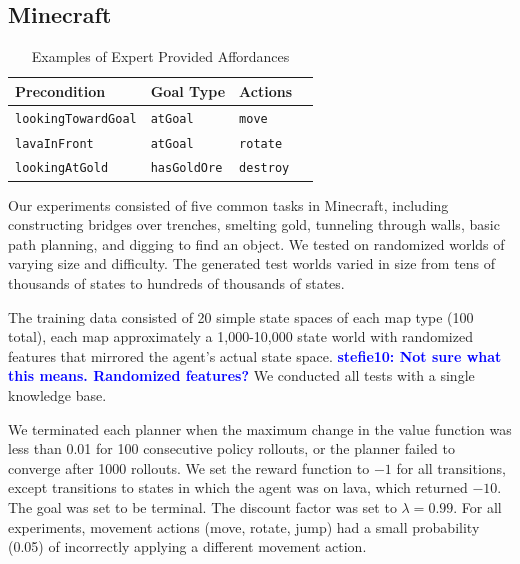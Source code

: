 \documentclass[letterpaper]{article}
\newcommand{\stnote}[1]{\textcolor{Blue}{\textbf{stefie10: #1}}}
\newcommand{\ra}[1]{\renewcommand{\arraystretch}{#1}} %
\begin{document}
\subsection{Minecraft}

\begin{table}[b]
\ra{1.4}
\begin{tabular}{@{}llll@{}}\toprule
Precondition & Goal Type & Actions \\ \midrule
\texttt{lookingTowardGoal} & \texttt{atGoal} & \texttt{move} \\
\texttt{lavaInFront} & \texttt{atGoal} & \texttt{rotate} \\
\texttt{lookingAtGold} & \texttt{hasGoldOre} & \texttt{destroy} \\
\bottomrule
\end{tabular}

\caption{Examples of Expert Provided Affordances\label{table:afford_kb_exp}}
\end{table}

Our experiments consisted of five common tasks in Minecraft, including
constructing bridges over trenches, smelting gold, tunneling
through walls, basic path planning, and digging to find an object.  We tested on 
randomized worlds of varying size and difficulty. The generated test
worlds varied in size from tens of thousands of states to hundreds of thousands of states.

The training data consisted of 20 simple state spaces of each map type
(100 total), each map approximately a 1,000-10,000 state world with
randomized features that mirrored the agent's actual state
space. \stnote{Not sure what this means.  Randomized features?} We
conducted all tests with a single knowledge base.

We terminated each planner when the maximum change in the value
function was less than 0.01 for 100 consecutive policy rollouts, or
the planner failed to converge after 1000 rollouts.  We set the reward
function to $-1$ for all transitions, except transitions to states in
which the agent was on lava, which returned $-10$. The goal was set to
be terminal. The discount factor was set to $\lambda = 0.99$. For all
experiments, movement actions (move, rotate, jump) had a small
probability (0.05) of incorrectly applying a different movement
action.
\end{document}
